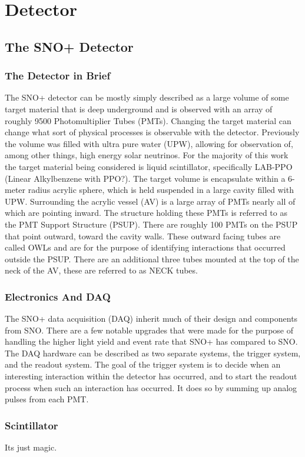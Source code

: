 
\chapter{Detector}

\ifpdf
    \graphicspath{{detector/figures/PNG/}{detector/figures/PDF/}{detector/figures/}}
\else
    \graphicspath{{detector/figures/EPS/}{detector/figures/}}
\fi



\section{The SNO+ Detector}
\subsection{The Detector in Brief}
The SNO+ detector can be mostly simply described as a large volume of some
target material that is deep underground and is observed with an array of
roughly 9500 Photomultiplier Tubes (PMTs).
Changing the target material can change what sort of physical processes is
observable with the detector.
Previously the volume was filled with ultra pure water (UPW), allowing for
observation of, among other things, high energy solar neutrinos.
For the majority of this work the target material being considered is liquid
scintillator, specifically LAB-PPO (Linear Alkylbenzene with PPO?).
The target volume is encapsulate within a 6-meter radius acrylic sphere,
which is held suspended in a large cavity filled with UPW.
Surrounding the acrylic vessel (AV) is a large array of PMTs nearly all of
which are pointing inward.
The structure holding these PMTs is referred to as the PMT Support Structure
(PSUP).
There are roughly 100 PMTs on the PSUP that point outward, toward the cavity
walls.
These outward facing tubes are called OWLs and are for the purpose of identifying
interactions that occurred outside the PSUP.
There are an additional three tubes mounted at the top of the neck of the AV,
these are referred to as NECK tubes.

\subsection{Electronics And DAQ}
The SNO+ data acquisition (DAQ) inherit much of their design and components from
SNO.
There are a few notable upgrades that were made for the purpose of handling the
higher light yield and event rate that SNO+ has compared to SNO.
The DAQ hardware can be described as two separate systems, the trigger system,
and the readout system.
The goal of the trigger system is to decide when an interesting interaction
within the detector has occurred, and to start the readout process when such an
interaction has occurred.
It does so by summing up analog pulses from each PMT.

\subsection{Scintillator}
Its just magic.

